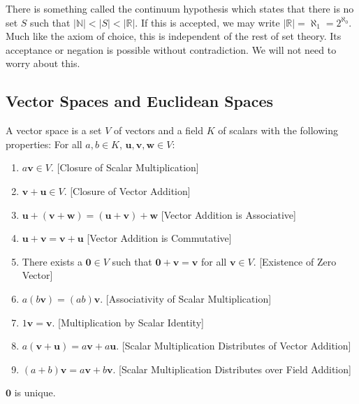 \documentclass[crop=false,class=book,oneside]{standalone}
\begin{document}
            \begin{remark}
            There is something called the continuum hypothesis which states that there is no set $S$ such that $|\mathbb{N}| < |S| < |\mathbb{R}|$. If this is accepted, we may write $|\mathbb{R}| = \aleph_1 = 2^{\aleph_0}$. Much like the axiom of choice, this is independent of the rest of set theory. Its acceptance or negation is possible without contradiction. We will not need to worry about this.
            \end{remark}
        \subsection{Vector Spaces and Euclidean Spaces}
            \begin{definition}
            A vector space is a set $V$ of vectors and a field $K$ of scalars with the following properties: For all $a,b\in K$, $\mathbf{u,v,w}\in V$:
            \begin{enumerate}
                \item $a\mathbf{v} \in V$. \hfill [Closure of Scalar Multiplication]
                \item $\mathbf{v}+\mathbf{u} \in V$. \hfill [Closure of Vector Addition]
                \item $\mathbf{u}+(\mathbf{v}+\mathbf{w}) = (\mathbf{u}+\mathbf{v})+\mathbf{w}$ \hfill [Vector Addition is Associative]
                \item $\mathbf{u}+\mathbf{v}=\mathbf{v}+\mathbf{u}$ \hfill [Vector Addition is Commutative]
                \item There exists a $\mathbf{0}\in V$ such that $\mathbf{0}+\mathbf{v}=\mathbf{v}$ for all $\mathbf{v}\in V$. \hfill [Existence of Zero Vector]
                \item $a(b\mathbf{v}) = (ab)\mathbf{v}$. \hfill [Associativity of Scalar Multiplication]
                \item $1 \mathbf{v} = \mathbf{v}$. \hfill[Multiplication by Scalar Identity]
                \item $a(\mathbf{v}+\mathbf{u}) = a\mathbf{v}+a\mathbf{u}$. \hfill [Scalar Multiplication Distributes of Vector Addition]
                \item $(a+b)\mathbf{v}= a\mathbf{v}+b\mathbf{v}$. \hfill [Scalar Multiplication Distributes over Field Addition]
            \end{enumerate}
            \end{definition}
            \begin{theorem}
            $\mathbf{0}$ is unique.
            \end{theorem}
\end{document}
